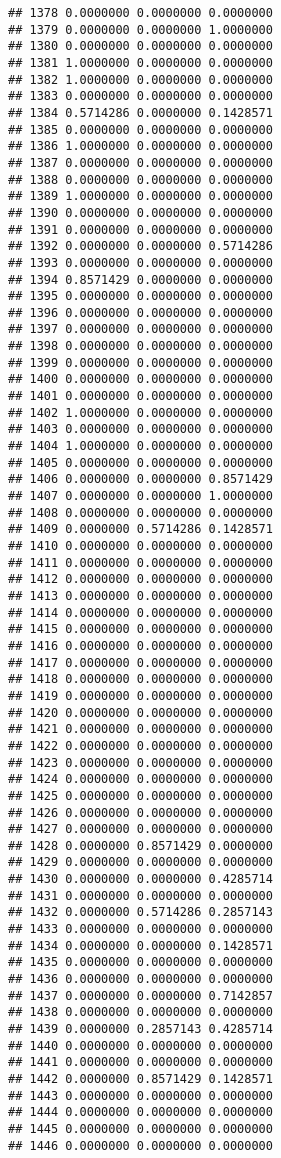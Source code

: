 \documentclass[
]{article}
\begin{document}
\begin{verbatim}
## 1378 0.0000000 0.0000000 0.0000000
## 1379 0.0000000 0.0000000 1.0000000
## 1380 0.0000000 0.0000000 0.0000000
## 1381 1.0000000 0.0000000 0.0000000
## 1382 1.0000000 0.0000000 0.0000000
## 1383 0.0000000 0.0000000 0.0000000
## 1384 0.5714286 0.0000000 0.1428571
## 1385 0.0000000 0.0000000 0.0000000
## 1386 1.0000000 0.0000000 0.0000000
## 1387 0.0000000 0.0000000 0.0000000
## 1388 0.0000000 0.0000000 0.0000000
## 1389 1.0000000 0.0000000 0.0000000
## 1390 0.0000000 0.0000000 0.0000000
## 1391 0.0000000 0.0000000 0.0000000
## 1392 0.0000000 0.0000000 0.5714286
## 1393 0.0000000 0.0000000 0.0000000
## 1394 0.8571429 0.0000000 0.0000000
## 1395 0.0000000 0.0000000 0.0000000
## 1396 0.0000000 0.0000000 0.0000000
## 1397 0.0000000 0.0000000 0.0000000
## 1398 0.0000000 0.0000000 0.0000000
## 1399 0.0000000 0.0000000 0.0000000
## 1400 0.0000000 0.0000000 0.0000000
## 1401 0.0000000 0.0000000 0.0000000
## 1402 1.0000000 0.0000000 0.0000000
## 1403 0.0000000 0.0000000 0.0000000
## 1404 1.0000000 0.0000000 0.0000000
## 1405 0.0000000 0.0000000 0.0000000
## 1406 0.0000000 0.0000000 0.8571429
## 1407 0.0000000 0.0000000 1.0000000
## 1408 0.0000000 0.0000000 0.0000000
## 1409 0.0000000 0.5714286 0.1428571
## 1410 0.0000000 0.0000000 0.0000000
## 1411 0.0000000 0.0000000 0.0000000
## 1412 0.0000000 0.0000000 0.0000000
## 1413 0.0000000 0.0000000 0.0000000
## 1414 0.0000000 0.0000000 0.0000000
## 1415 0.0000000 0.0000000 0.0000000
## 1416 0.0000000 0.0000000 0.0000000
## 1417 0.0000000 0.0000000 0.0000000
## 1418 0.0000000 0.0000000 0.0000000
## 1419 0.0000000 0.0000000 0.0000000
## 1420 0.0000000 0.0000000 0.0000000
## 1421 0.0000000 0.0000000 0.0000000
## 1422 0.0000000 0.0000000 0.0000000
## 1423 0.0000000 0.0000000 0.0000000
## 1424 0.0000000 0.0000000 0.0000000
## 1425 0.0000000 0.0000000 0.0000000
## 1426 0.0000000 0.0000000 0.0000000
## 1427 0.0000000 0.0000000 0.0000000
## 1428 0.0000000 0.8571429 0.0000000
## 1429 0.0000000 0.0000000 0.0000000
## 1430 0.0000000 0.0000000 0.4285714
## 1431 0.0000000 0.0000000 0.0000000
## 1432 0.0000000 0.5714286 0.2857143
## 1433 0.0000000 0.0000000 0.0000000
## 1434 0.0000000 0.0000000 0.1428571
## 1435 0.0000000 0.0000000 0.0000000
## 1436 0.0000000 0.0000000 0.0000000
## 1437 0.0000000 0.0000000 0.7142857
## 1438 0.0000000 0.0000000 0.0000000
## 1439 0.0000000 0.2857143 0.4285714
## 1440 0.0000000 0.0000000 0.0000000
## 1441 0.0000000 0.0000000 0.0000000
## 1442 0.0000000 0.8571429 0.1428571
## 1443 0.0000000 0.0000000 0.0000000
## 1444 0.0000000 0.0000000 0.0000000
## 1445 0.0000000 0.0000000 0.0000000
## 1446 0.0000000 0.0000000 0.0000000

\end{verbatim}
\end{document}
